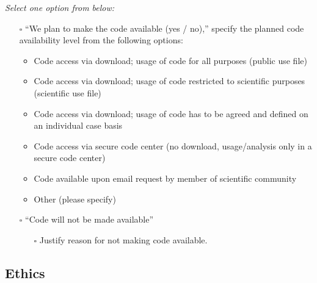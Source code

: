 \documentclass[
]{article}
\providecommand{\tightlist}{%
  \setlength{\itemsep}{0pt}\setlength{\parskip}{0pt}}\usepackage{longtable,booktabs,array}
\begin{document}
\begin{tcolorbox}[enhanced jigsaw, toprule=.15mm, titlerule=0mm, coltitle=black, title=\textcolor{quarto-callout-caution-color}{\faFire}\hspace{0.5em}{Preregistration Item}, bottomtitle=1mm, arc=.35mm, breakable, toptitle=1mm, bottomrule=.15mm, left=2mm, colframe=quarto-callout-caution-color-frame, colback=white, rightrule=.15mm, leftrule=.75mm, colbacktitle=quarto-callout-caution-color!10!white, opacityback=0, opacitybacktitle=0.6]

\emph{Select one option from below:}

\begin{itemize}
\tightlist
\item[$\square$]
  ``We plan to make the code available (yes / no),'' specify the planned
  code availability level from the following options:

  \begin{itemize}
  \tightlist
  \item
    Code access via download; usage of code for all purposes (public use
    file)
  \item
    Code access via download; usage of code restricted to scientific
    purposes (scientific use file)
  \item
    Code access via download; usage of code has to be agreed and defined
    on an individual case basis
  \item
    Code access via secure code center (no download, usage/analysis only
    in a secure code center)
  \item
    Code available upon email request by member of scientific community
  \item
    Other (please specify)
  \end{itemize}
\item[$\square$]
  ``Code will not be made available''

  \begin{itemize}
  \tightlist
  \item[$\square$]
    Justify reason for not making code available.
  \end{itemize}
\end{itemize}

\end{tcolorbox}

\subsection*{Ethics}\label{ethics}
\end{document}
